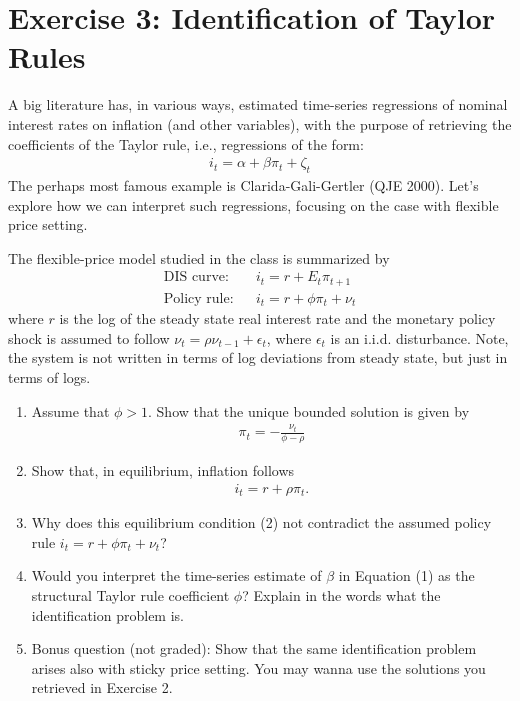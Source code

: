 \documentclass[11pt]{article}
\newcommand{\ben}{\begin{enumerate}}
\newcommand{\een}{\end{enumerate}}
\begin{document}
\section*{Exercise 3: Identification of Taylor Rules}
A big literature has, in various ways, estimated time-series regressions of nominal interest rates on inflation (and other variables), with the purpose of retrieving the coefficients of the Taylor rule, i.e., regressions of the form:
\begin{eqnarray}
i_t = \alpha + \beta \pi_t + \zeta_t
\end{eqnarray}
The perhaps most famous example is Clarida-Gali-Gertler (QJE 2000). Let's explore how we can interpret such regressions, focusing on the case with flexible price setting.

The flexible-price model studied in the class is summarized by
\begin{eqnarray}
\text{DIS curve:} &&  i_t = r + E_t \pi_{t+1}  \nonumber \\
\text{Policy rule:} && i_t = r + \phi \pi_t + \nu_t \nonumber 
\end{eqnarray}
where $r$ is the log of the steady state real interest rate and the monetary policy shock is assumed to follow $\nu_t = \rho \nu_{t-1} + \epsilon_t$, where $\epsilon_t$ is an i.i.d. disturbance. Note, the system is not written in terms of log deviations from steady state, but just in terms of logs.

\ben
	\item Assume that $\phi>1$. Show that the unique bounded solution is given by
	\begin{eqnarray}
	\pi_t = - \frac{\nu_t}{\phi-\rho} \nonumber
	\end{eqnarray}
	
	\item Show that, in equilibrium, inflation follows
	\begin{eqnarray}
	i_t = r  +  \rho \pi_{t}.
	\end{eqnarray}
	
	\item Why does this equilibrium condition (2) not contradict the assumed policy rule $i_t = r + \phi \pi_t + \nu_t$?
	
	\item Would you interpret the time-series estimate of $\beta$ in Equation (1) as the structural Taylor rule coefficient $\phi$? Explain in the words what the identification problem is.
	
	\item Bonus question (not graded): Show that the same identification problem arises also with sticky price setting. You may wanna use the solutions you retrieved in Exercise 2.
\een


	
\end{document}
